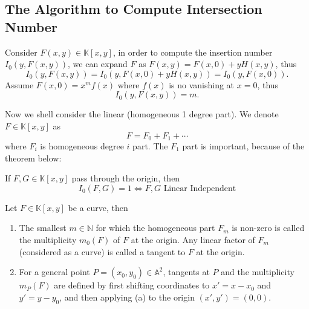 \documentclass[10pt]{article}
\begin{document}
\subsection{The Algorithm to Compute Intersection Number}

Consider $ F(x,y) \in \mathbb{K}[x,y]$, in order to compute the insertion number $ I_{0}(y, F(x,y))$, we can expand $ F$ as $ F(x,y) = F(x,0) + y H(x,y)$, thus
\begin{equation*}
  I_0(y, F(x,y)) = I_0(y, F(x,0) + y H(x,y)) = I_0(y, F(x,0)).
\end{equation*}
Assume $ F(x,0) = x^{m} f(x)$ where $ f(x)$ is no vanishing at $ x=0$, thus
\begin{equation*}
  I_0(y, F(x,y)) = m.
\end{equation*}

Now we shell consider the linear (homogeneous 1 degree part). We denote $ F \in \mathbb{K}[x,y]$ as
\begin{equation*}
  F = F_0 + F_1 +\cdots
\end{equation*}
where $ F_{i}$ is homogeneous degree $ i$ part. The $ F_{1}$ part is important, because of the theorem below:
\begin{theorem}
  If $ F, G \in \mathbb{K}[x,y]$ pass through the origin, then
  \begin{equation*}
    I_0(F,G) = 1 \Leftrightarrow F, G \text{ Linear Independent}
  \end{equation*}
\end{theorem}

\begin{definition} Let $ F \in \mathbb{K}[x,y]$ be a curve, then
  \begin{enumerate}[(1)]
    \item The smallest \( m \in \mathbb{N} \) for which the homogeneous part \( F_m \) is non-zero is called the multiplicity \( m_0(F) \) of \( F \) at the origin. Any linear factor of \( F_m \) (considered as a curve) is called a tangent to \( F \) at the origin.
    \item For a general point \( P = (x_0, y_0) \in \mathbb{A}^2 \), tangents at \( P \) and the multiplicity \( m_P(F) \) are defined by first shifting coordinates to \( x' = x - x_0 \) and \( y' = y - y_0 \), and then applying (a) to the origin \( (x', y') = (0, 0) \).
  \end{enumerate}
\end{definition}

\label{LastPage}
\end{document}
